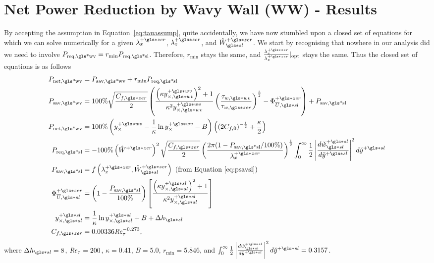 \section{Net Power Reduction by Wavy Wall (WW) - Results}
By accepting the assumption in Equation~\eqref{eq:tauassump}, quite accidentally, we have now stumbled upon a closed set of equations for which we can solve numerically for a given  $\lambda_x\pz$, $\lambda_z\pz$, and $\hat{W}\ssl\pz$. We start by recognising that nowhere in our analysis did we need to involve $P_\text{req,\gls*{wv}}=r_\text{min} P_\text{req,\gls*{sl}}  $. Therefore, $r_\text{min} $ stays the same, and $\frac{\lambda_x\pz}{\lambda_z\pz}\rvert_\text{opt} $ stays the same. Thus the closed set of equations is as follows
\begin{align}
	P_\text{net,\gls*{wv}} &= P_\text{sav,\gls*{wv}} + r_\text{min} P_\text{req,\gls*{sl}} \label{eq:Pnetww}\\  
	P_\text{sav,\gls*{wv}} &=  100\% \sqrt{\frac{C_{f,\gls*{zer}}}{2}}\left(  \frac{\left(  \kappa y_{\times,\gls*{wv}}\pw  \right) ^2+ 1}{\kappa^2 y_{\times,\gls*{wv}}\pw} \left( \frac{\tau_{w,\gls*{wv}}}{\tau_{w,\gls*{zer}}} \right) ^{\frac{3}{2}}-\Phi _{\overline{U},\gls*{sl}}\pz\right) +P_\text{sav,\gls*{sl}} \label{eq:Psavww}\\
	P_\text{net,\gls*{wv}} &=100\%\left(  y_{\times}\pw - \frac{1}{\kappa}\ln y_{\times}\pw- B \right) \left( (2C_{f,0})^{-\frac{1}{2}} +\frac{\kappa}{2} \right) \label{eq:ycross}\\
	P_\text{req,\gls*{sl}} &= -100\%\left( \hat{W}\pz  \right) ^2\sqrt{\frac{C_{f,\gls*{zer}}}{2}}   \left( \frac{2\pi (1-P_\text{sav,\gls*{sl}} / 100\%) }{\lambda_x\pz}\right) ^{\frac{1}{3}}\int_{0}^{\infty} \frac{1}{2} \left| \frac{d\check{w}\ps\ssl}{d\check{y}\ps} \right| ^2 d\check{y}\ps \\ 
		P_\text{sav,\gls*{sl}} &= f\left(\lambda_x\pz, \hat{W}\ssl\pz\right) \text{ (from Equation~\eqref{eq:psavsl})}\\
		\Phi _{\overline{U},\gls*{sl}}\pz &= \left( 1-\frac{P_\text{sav,\gls*{sl}} }{100\%} \right)  \left[\frac{\left(  \kappa y_{\times,\gls*{sl}}\ps  \right) ^2+ 1}{\kappa^2 y_{\times,\gls*{sl}}\ps}\right]\\
	y_{\times,\gls*{sl}}\ps&=\frac{1}{\kappa}\ln  y_{\times,\gls*{sl}}\ps +B+\Delta h\ssl \\
	C_{f,\gls*{zer}} &= 0.00336\Rey_{\tau}^{-0.273}
,\end{align}
where $\Delta h \ssl=8$, $\mbox{\textit{Re}}_{\tau} = 200$,  $\kappa=0.41$,  $B=5.0$,  $r_\text{min} =5.846$, and $\int_{0}^{\infty} \frac{1}{2} \left| \frac{d\check{w}\ps\ssl}{d\check{y}\ps} \right| ^2 d\check{y}\ps = 0.3157$.

